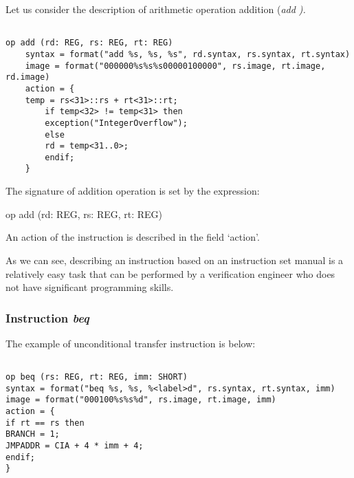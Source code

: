 \documentclass[oneside,final,12pt]{extreport}
\begin{document}
\bigskip

Let us consider the description of arithmetic operation addition (\it add \upshape).

\bigskip

\begin{verbatim}

op add (rd: REG, rs: REG, rt: REG)
	syntax = format("add %s, %s, %s", rd.syntax, rs.syntax, rt.syntax)
	image = format("000000%s%s%s00000100000", rs.image, rt.image, rd.image)
	action = {
	temp = rs<31>::rs + rt<31>::rt; 
		if temp<32> != temp<31> then 
		exception("IntegerOverflow");
		else
		rd = temp<31..0>;
		endif;
	}

\end{verbatim}


The signature of addition operation is set by the expression: 

\bigskip

op add (rd: REG, rs: REG, rt: REG)

\bigskip






An action of the instruction is described in the field ‘action’.  

As we can see, describing an instruction based on an instruction set manual is a relatively easy task that can be performed by a verification engineer who does not have significant programming skills.


\bigskip
\bigskip


\subsubsection*{Instruction \itshape \bfseries beq}

\bigskip

The example of unconditional transfer instruction is below:

\begin{verbatim}

op beq (rs: REG, rt: REG, imm: SHORT)
syntax = format("beq %s, %s, %<label>d", rs.syntax, rt.syntax, imm)
image = format("000100%s%s%d", rs.image, rt.image, imm)
action = {
if rt == rs then
BRANCH = 1;
JMPADDR = CIA + 4 * imm + 4;
endif;
}

\end{verbatim}
\end{document}
